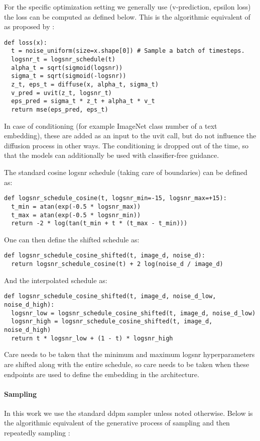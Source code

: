 \documentclass[nohyperref]{article}
\theoremstyle{plain}
\theoremstyle{definition}
\theoremstyle{remark}
\begin{document}
For the specific optimization setting we generally use (v-prediction, epsilon loss) the loss can be computed as defined below. This is the algorithmic equivalent of  as proposed by \citep{ho2020denoising,kingma2021vdm}:
\begin{lstlisting}[style=python]
def loss(x):
  t = noise_uniform(size=x.shape[0]) # Sample a batch of timesteps.
  logsnr_t = logsnr_schedule(t)
  alpha_t = sqrt(sigmoid(logsnr))
  sigma_t = sqrt(sigmoid(-logsnr))
  z_t, eps_t = diffuse(x, alpha_t, sigma_t)
  v_pred = uvit(z_t, logsnr_t)
  eps_pred = sigma_t * z_t + alpha_t * v_t
  return mse(eps_pred, eps_t)
\end{lstlisting}

In case of conditioning (for example ImageNet class number of a text embedding), these are added as an input to the uvit call, but do not influence the diffusion process in other ways. The conditioning is dropped out  of the time, so that the models can additionally be used with classifier-free guidance.


The standard cosine logsnr schedule (taking care of boundaries) can be defined as:
\begin{lstlisting}[style=python]
def logsnr_schedule_cosine(t, logsnr_min=-15, logsnr_max=+15):
  t_min = atan(exp(-0.5 * logsnr_max))
  t_max = atan(exp(-0.5 * logsnr_min))
  return -2 * log(tan(t_min + t * (t_max - t_min)))
\end{lstlisting}

One can then define the shifted schedule as:
\begin{lstlisting}[style=python]
def logsnr_schedule_cosine_shifted(t, image_d, noise_d):
  return logsnr_schedule_cosine(t) + 2 log(noise_d / image_d)
\end{lstlisting}

And the interpolated schedule as:
\begin{lstlisting}[style=python]
def logsnr_schedule_cosine_shifted(t, image_d, noise_d_low, noise_d_high):
  logsnr_low = logsnr_schedule_cosine_shifted(t, image_d, noise_d_low)
  logsnr_high = logsnr_schedule_cosine_shifted(t, image_d, noise_d_high)
  return t * logsnr_low + (1 - t) * logsnr_high
\end{lstlisting}

Care needs to be taken that the minimum and maximum logsnr hyperparameters are shifted along with the entire schedule, so care needs to be taken when these endpoints are used to define the embedding in the architecture.

\paragraph{Sampling}
In this work we use the standard ddpm sampler unless noted otherwise. Below is the algorithmic equivalent of the generative process of sampling  and then repeatedly sampling :
\end{document}

